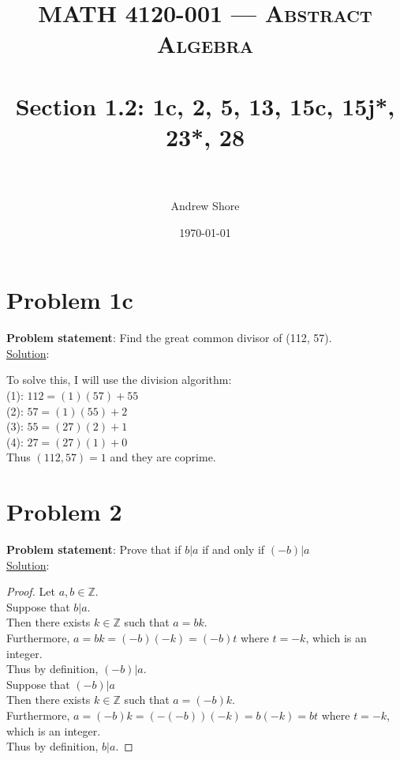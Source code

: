 \documentclass{article} %
\title{ 
\normalfont \normalsize 
\textsc{MATH 4120-001 --- Abstract Algebra} \\
\horrule{0.5pt} \\[0cm] %
\huge Section 1.2: 1c, 2, 5, 13, 15c, 15j*, 23*, 28  \\ %
\horrule{2pt} \\[0cm] %
}
\author{Andrew Shore} %
\date{\normalsize\today} %
\begin{document}
\maketitle %


\section*{Problem 1c}


\textbf{Problem statement}: Find the great common divisor of (112, 57).
\\

\underline{Solution}: 
\begin{addmargin}[1em]{0em}
To solve this, I will use the division algorithm:
\\(1): $112 = (1)(57) + 55$
\\(2): $57 = (1)(55) + 2$
\\(3): $55 = (27)(2) + 1$
\\(4): $27 = (27)(1) + 0$
\\Thus $(112, 57) = 1$ and they are coprime.
\end{addmargin}    

\newpage

\section*{Problem 2}

\textbf{Problem statement}: Prove that if $b|a$ if and only if $(-b)|a$
\\

\underline{Solution}: 
\begin{addmargin}[1em]{0em}
\begin{proof}
Let $a,b \in \mathbb{Z}$.
\\ \marginpar{$\Rightarrow$}
Suppose that $b|a$.
\\Then there exists $k \in \mathbb{Z}$ such that $a = bk$.
\\Furthermore, $a = bk = (-b)(-k) = (-b)t$ where $t = -k$, which is an integer.
\\Thus by definition, $(-b)|a$.
\\ \marginpar{$\Leftarrow$}
Suppose that $(-b)|a$
\\Then there exists $k \in \mathbb{Z}$ such that $a = (-b)k$.
\\Furthermore, $a = (-b)k = (-(-b))(-k) = b(-k) = bt$ where $t = -k$, which is an integer.
\\Thus by definition, $b|a$.
\end{proof}
\end{addmargin}
\end{document}
